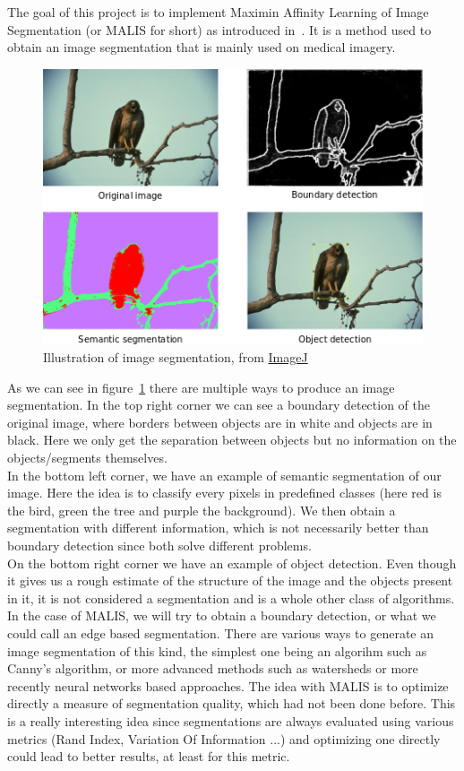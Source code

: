 The goal of this project is to implement Maximin Affinity Learning of Image
Segmentation (or MALIS for short) as introduced in~\cite{turaga_maximin_2009}.
It is a method used to obtain an image segmentation that is mainly used on medical
imagery.\\

\begin{figure}[!htbp]
	\centering
	\includegraphics[width=0.7\linewidth]{./images/segmentation.png}
	\caption{Illustration of image segmentation, from
	\href{imagej.net/File:TWS-application-examples.png}{ImageJ}}%
	\label{fig:segmentation}
\end{figure}

As we can see in figure~\ref{fig:segmentation} there are multiple ways to
produce an image segmentation. In the top right corner we can see a boundary
detection of the original image, where borders between objects are in white and
objects are in black. Here we only get the separation between objects but no
information on the objects/segments themselves.\\
In the bottom left corner, we have an example of semantic segmentation of our
image. Here the idea is to classify every pixels in predefined classes (here
red is the bird, green the tree and purple the background). We then obtain a
segmentation with different information, which is not necessarily better than
boundary detection since both solve different problems.\\
On the bottom right corner we have an example of object detection. Even though
it gives us a rough estimate of the structure of the image and the objects
present in it, it is not considered  a segmentation and is a whole other class
of algorithms.\\

In the case of MALIS, we will try to obtain a boundary detection, or what we
could call an edge based segmentation. There are various ways to generate an
image segmentation of this kind, the simplest one being an algorihm such as
Canny's algorithm, or more advanced methods such as watersheds or more recently
neural networks based approaches. The idea with MALIS is to optimize directly a
measure of segmentation quality, which had not been done before. This is a
really interesting idea since segmentations are always evaluated using various
metrics (Rand Index, Variation Of Information ...) and optimizing one directly
could lead to better results, at least for this metric.\\

